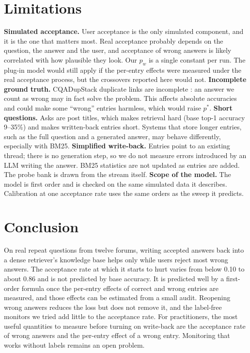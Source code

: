 \documentclass[11pt]{article}
\begin{document}
\section{Limitations}
\textbf{Simulated acceptance.} User acceptance is the only simulated component, and it is the one that matters most. Real acceptance probably depends on the question, the answer and the user, and acceptance of wrong answers is likely correlated with how plausible they look. Our $p_w$ is a single constant per run. The plug-in model would still apply if the per-entry effects were measured under the real acceptance process, but the crossovers reported here would not.
\textbf{Incomplete ground truth.} CQADupStack duplicate links are incomplete \citep{hoogeveen2015cqadupstack}: an answer we count as wrong may in fact solve the problem. This affects absolute accuracies and could make some ``wrong'' entries harmless, which would raise $p^*$.
\textbf{Short questions.} Asks are post titles, which makes retrieval hard (base top-1 accuracy 9--35\%) and makes written-back entries short. Systems that store longer entries, such as the full question and a generated answer, may behave differently, especially with BM25.
\textbf{Simplified write-back.} Entries point to an existing thread; there is no generation step, so we do not measure errors introduced by an LLM writing the answer. BM25 statistics are not updated as entries are added. The probe bank is drawn from the stream itself.
\textbf{Scope of the model.} The model is first order and is checked on the same simulated data it describes. Calibration at one acceptance rate uses the same orders as the sweep it predicts.

\section{Conclusion}
On real repeat questions from twelve forums, writing accepted answers back into a dense retriever's knowledge base helps only while users reject most wrong answers. The acceptance rate at which it starts to hurt varies from below 0.10 to about 0.86 and is not predicted by base accuracy. It is predicted well by a first-order formula once the per-entry effects of correct and wrong entries are measured, and those effects can be estimated from a small audit. Reopening wrong answers reduces the loss but does not remove it, and the label-free monitors we tried add little to the acceptance rate. For practitioners, the most useful quantities to measure before turning on write-back are the acceptance rate of wrong answers and the per-entry effect of a wrong entry. Monitoring that works without labels remains an open problem.
\end{document}
